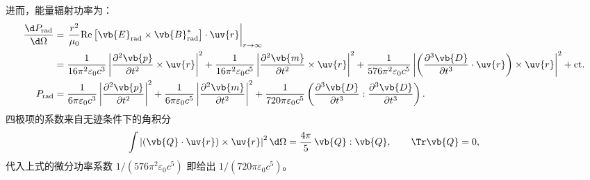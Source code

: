 进而，能量辐射功率为：
\begin{align*}
	\frac{\d P_{\text{rad}}}{\d \Omega} & = \left. \frac{r^2}{\mu_0} \text{Re}\left[ \vb{E}_{\text{rad}} \times \vb{B}_{\text{rad}}^* \right] \cdot \uv{r} \right|_{r \to \infty}                                                                                                                                                                                 \\&= \frac{1}{16\pi^2\varepsilon_0 c^3} \left| \frac{\partial^2 \vb{p}}{\partial t^2} \times \uv{r} \right|^2 + \frac{1}{16\pi^2\varepsilon_0 c^5} \left| \frac{\partial^2 \vb{m}}{\partial t^2} \times \uv{r} \right|^2
	+ \frac{1}{576\pi^2\varepsilon_0 c^5} \left| \left( \frac{\partial^3 \vb{D}}{\partial t^3} \cdot \uv{r} \right) \times \uv{r} \right|^2 + \text{ct}.                                                                                                                                                                                                          \\
	P_{\text{rad}}                      & = \frac{1}{6\pi\varepsilon_0 c^3} \left| \frac{\partial^2 \vb{p}}{\partial t^2} \right|^2 + \frac{1}{6\pi\varepsilon_0 c^5} \left| \frac{\partial^2 \vb{m}}{\partial t^2} \right|^2 + \frac{1}{720\pi\varepsilon_0 c^5} \left( \frac{\partial^3 \vb{D}}{\partial t^3} : \frac{\partial^3 \vb{D}}{\partial t^3} \right).
\end{align*}
四极项的系数来自无迹条件下的角积分
\begin{equation*}
	\int \left|(\vb{Q}\cdot\uv{r})\times\uv{r}\right|^2 \d\Omega
	=\frac{4\pi}{5}\,\vb{Q}:\vb{Q},\qquad \Tr \vb{Q}=0,
\end{equation*}
代入上式的微分功率系数 \(1/(576\pi^2\varepsilon_0 c^5)\) 即给出 \(1/(720\pi\varepsilon_0 c^5)\)。

